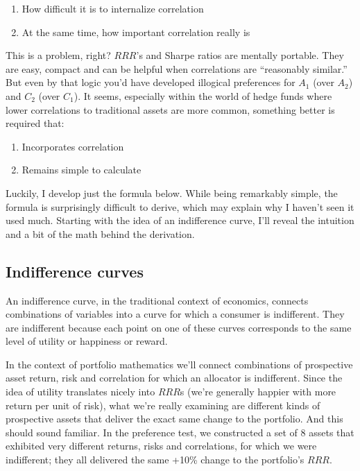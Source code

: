 \documentclass[]{article}
\providecommand{\tightlist}{%
  \setlength{\itemsep}{0pt}\setlength{\parskip}{0pt}}
\begin{document}
\begin{enumerate}
\def\labelenumi{\arabic{enumi}.}
\tightlist
\item
  How difficult it is to internalize correlation
\item
  At the same time, how important correlation really is
\end{enumerate}

This is a problem, right? \(RRR\)'s and Sharpe ratios are mentally
portable. They are easy, compact and can be helpful when correlations
are ``reasonably similar.'' But even by that logic you'd have developed
illogical preferences for \(A_1\) (over \(A_2\)) and \(C_2\) (over
\(C_1\)). It seems, especially within the world of hedge funds where
lower correlations to traditional assets are more common, something
better is required that:

\begin{enumerate}
\def\labelenumi{\arabic{enumi}.}
\tightlist
\item
  Incorporates correlation
\item
  Remains simple to calculate
\end{enumerate}

Luckily, I develop just the formula below. While being remarkably
simple, the formula is surprisingly difficult to derive, which may
explain why I haven't seen it used much. Starting with the idea of an
indifference curve, I'll reveal the intuition and a bit of the math
behind the derivation.

\hypertarget{indifference-curves}{%
\subsection{Indifference curves}\label{indifference-curves}}

An indifference curve, in the traditional context of economics, connects
combinations of variables into a curve for which a consumer is
indifferent. They are indifferent because each point on one of these
curves corresponds to the same level of utility or happiness or reward.

In the context of portfolio mathematics we'll connect combinations of
prospective asset return, risk and correlation for which an allocator is
indifferent. Since the idea of utility translates nicely into \(RRR\)s
(we're generally happier with more return per unit of risk), what we're
really examining are different kinds of prospective assets that deliver
the exact same change to the portfolio. And this should sound familiar.
In the preference test, we constructed a set of 8 assets that exhibited
very different returns, risks and correlations, for which we were
indifferent; they all delivered the same +10\% change to the portfolio's
\(RRR\).
\end{document}
